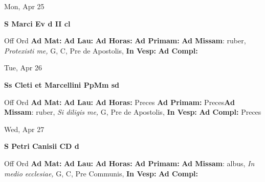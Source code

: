 \documentclass[10pt]{book}
\begin{document}
\begin{center}
\begin{minipage}{3.5in}
\vspace{2em}
\begin{center}Mon, Apr 25
\end{center}
\textbf{ \large S Marci Ev
\textnormal{\normalsize d II cl}}

\begin{justify}Off Ord
\textbf{Ad Mat: }
\textbf{Ad Lau: }
\textbf{Ad Horas: }
\textbf{Ad Primam: }\textbf{Ad Missam}: ruber, \textit{Protexisti me,} G, C, Pre de Apostolis, 
\textbf{In Vesp: }
\textbf{Ad Compl: }
\end{justify}
\end{minipage}
\end{center}

\begin{center}
\begin{minipage}{3.5in}
\vspace{2em}
\begin{center}Tue, Apr 26
\end{center}
\textbf{ \large Ss Cleti et Marcellini PpMm
\textnormal{\normalsize sd}}

\begin{justify}Off Ord
\textbf{Ad Mat: }
\textbf{Ad Lau: }
\textbf{Ad Horas: }Preces
\textbf{Ad Primam: }Preces\textbf{Ad Missam}: ruber, \textit{Si diligis me,} G, Pre de Apostolis, 
\textbf{In Vesp: }
\textbf{Ad Compl: }Preces
\end{justify}
\end{minipage}
\end{center}

\begin{center}
\begin{minipage}{3.5in}
\vspace{2em}
\begin{center}Wed, Apr 27
\end{center}
\textbf{ \large S Petri Canisii CD
\textnormal{\normalsize d}}

\begin{justify}Off Ord
\textbf{Ad Mat: }
\textbf{Ad Lau: }
\textbf{Ad Horas: }
\textbf{Ad Primam: }\textbf{Ad Missam}: albus, \textit{In medio ecclesiae,} G, C, Pre Communis, 
\textbf{In Vesp: }
\textbf{Ad Compl: }
\end{justify}
\end{minipage}
\end{center}
\end{document}
